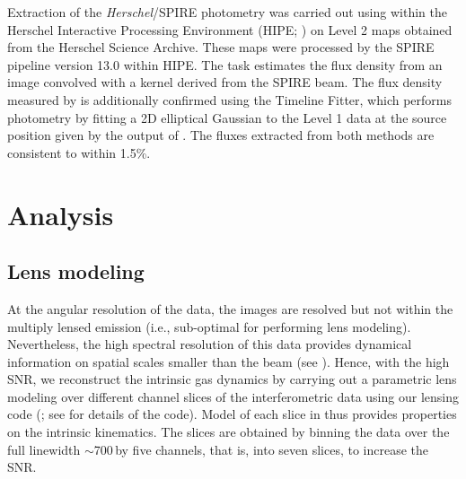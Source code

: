 \documentclass[]{emulateapj}
\begin{document}
Extraction of the {\it Herschel}/SPIRE photometry was
carried out using  within the Herschel Interactive
Processing Environment (HIPE; \citealt{Ott10a})
on Level 2 maps obtained from the Herschel Science Archive.
These maps were processed by the SPIRE pipeline
version 13.0 within HIPE. The  task estimates
the flux density from an image convolved with a kernel
derived from the SPIRE beam. The flux density
measured by  is additionally confirmed
using the Timeline Fitter, which performs photometry
by fitting a 2D elliptical Gaussian to the Level 1 data at the
source position given by the output of . The fluxes
extracted from both methods are consistent to within 1.5\%.



\section{Analysis} \label{sec:anal}
\subsection{Lens modeling} \label{sec:lensmodel} %
At the angular resolution of the \bco data, the images are resolved
but not within the multiply lensed emission (i.e., sub-optimal for
performing lens modeling). Nevertheless, the high spectral
resolution of this data provides dynamical information on
spatial scales smaller than the beam (see ).
Hence, with the high SNR, we reconstruct the intrinsic gas
dynamics by carrying out a parametric lens modeling over different
channel slices of the interferometric data using our lensing code
\uvmcmcfit (\citealt{uvmcmcfit15a}; see \citealt{Bussmann15a} for details of
the code). Model of each slice in  thus provides
properties on the intrinsic kinematics. The slices
are obtained by binning the data over the full linewidth
$\sim$700\,\kms by five channels,
that is, into seven slices, to increase the SNR.
\end{document}
